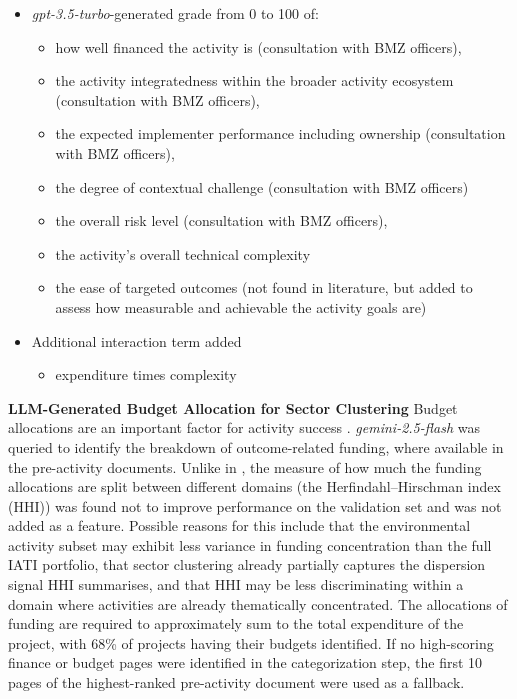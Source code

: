 \documentclass[12pt,a4paper]{article}
\let\citep\parencite
\begin{document}
\begin{itemize}
 \item \emph{gpt-3.5-turbo}-generated grade from 0 to 100 of:
 \begin{itemize}[noitemsep,topsep=0pt]
 \item  how well financed the activity is (consultation with BMZ officers), \citep{bulmanGoodCountriesGood2017} \citep{goldembergMindingGapAid2025} \citep{eilersVolumeRiskComplexitya}
 \item  the activity integratedness within the broader activity ecosystem (consultation with BMZ officers), \citep{vivaltHowMuchCan2020}
 \item  the expected implementer performance including ownership (consultation with BMZ officers), \citep{bulmanGoodCountriesGood2017} \citep{goldembergMindingGapAid2025} \citep{ashtonPuzzleMissingPieces2023}
 \item  the degree of contextual challenge (consultation with BMZ officers)
 \item  the overall risk level (consultation with BMZ officers), \citep{eilersVolumeRiskComplexitya}
 \item  the activity's overall technical complexity \citep{eilersVolumeRiskComplexitya}
 \item  the ease of targeted outcomes (not found in literature, but added to assess how measurable and achievable the activity goals are)
\end{itemize}
\item Additional interaction term added
\begin{itemize}
\item expenditure times complexity
\end{itemize}
\end{itemize}

\textbf{LLM-Generated Budget Allocation for Sector Clustering}
Budget allocations are an important factor for activity success \citep{goldembergMindingGapAid2025}. \emph{gemini-2.5-flash} was queried to identify the breakdown of outcome-related funding, where available in the pre-activity documents. Unlike in \citep{goldembergMindingGapAid2025}, the measure of how much the funding allocations are split between different domains (the Herfindahl–Hirschman index (HHI)) was found not to improve performance on the validation set and was not added as a feature. Possible reasons for this include that the environmental activity subset may exhibit less variance in funding concentration than the full IATI portfolio, that sector clustering already partially captures the dispersion signal HHI summarises, and that HHI may be less discriminating within a domain where activities are already thematically concentrated. The allocations of funding are required to approximately sum to the total expenditure of the project, with 68\% of projects having their budgets identified. If no high-scoring finance or budget pages were identified in the categorization step, the first 10 pages of the highest-ranked pre-activity document were used as a fallback.
\end{document}
